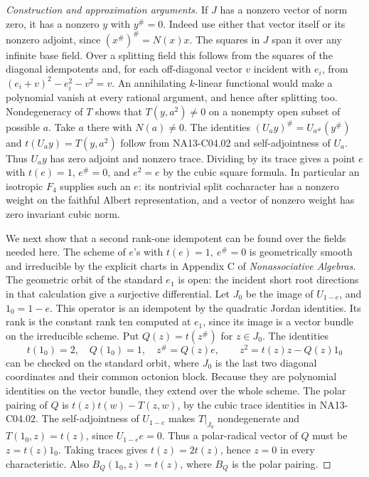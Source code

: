 \documentclass[11pt,a4paper,openany,oneside]{book}
\theoremstyle{resultstyle}
\theoremstyle{definition}
\numberwithin{equation}{chapter}
\begin{document}
\begin{proof}[Construction and approximation arguments]
If \(J\) has a nonzero vector of norm zero,
it has a nonzero \(y\) with \(y^\#=0\).
Indeed use either that vector itself or its
nonzero adjoint, since
\((x^\#)^\#=N(x)x\).
The squares in \(J\) span it over any infinite
base field. Over a splitting field this follows
from the squares of the diagonal idempotents
and, for each off-diagonal vector \(v\) incident
with \(e_i\), from
\((e_i+v)^2-e_i^2-v^2=v\).
An annihilating \(k\)-linear functional would make
a polynomial vanish at every rational argument,
and hence after splitting too. Nondegeneracy of
\(T\) shows that \(T(y,a^2)\ne0\) on a nonempty
open subset of possible \(a\). Take \(a\) there
with \(N(a)\ne0\). The identities
\((U_a y)^\#=U_{a^\#}(y^\#)\) and
\(t(U_a y)=T(y,a^2)\) follow from NA13-C04.02
and self-adjointness of \(U_a\). Thus \(U_a y\)
has zero adjoint and nonzero trace. Dividing
by its trace gives a point \(e\) with \(t(e)=1\),
\(e^\#=0\), and \(e^2=e\) by the cubic square
formula. In particular an isotropic \(F_4\)
supplies such an \(e\): its nontrivial split
cocharacter has a nonzero weight on the
faithful Albert representation, and a vector
of nonzero weight has zero invariant cubic norm.

We next show that a second rank-one idempotent
can be found over the fields needed here.
The scheme of \(e\)'s with \(t(e)=1,\ e^\#=0\)
is geometrically smooth and irreducible by
the explicit charts in Appendix C of
\emph{Nonassociative Algebras}. The geometric orbit
of the standard \(e_1\) is open: the incident
short root directions in that calculation give
a surjective differential. Let \(J_0\) be the
image of \(U_{1-e}\), and \(1_0=1-e\).
This operator is an idempotent by the
quadratic Jordan identities. Its rank is the
constant rank ten computed at \(e_1\), since its
image is a vector bundle on the irreducible
scheme. Put \(Q(z)=t(z^\#)\) for \(z\in J_0\).
The identities
\[
 t(1_0)=2,\quad Q(1_0)=1,\quad
 z^\#=Q(z)e,\qquad z^2=t(z)z-Q(z)1_0
\]
can be checked on the standard orbit, where
\(J_0\) is the last two diagonal coordinates and
their common octonion block. Because they are
polynomial identities on the vector bundle,
they extend over the whole scheme. The polar
pairing of \(Q\) is \(t(z)t(w)-T(z,w)\),
by the cubic trace identities in NA13-C04.02.
The self-adjointness of \(U_{1-e}\) makes
\(T|_{J_0}\) nondegenerate and
\(T(1_0,z)=t(z)\), since \(U_{1-e}e=0\).
Thus a polar-radical vector of \(Q\) must be
\(z=t(z)1_0\). Taking traces gives
\(t(z)=2t(z)\), hence \(z=0\) in every
characteristic. Also
\(B_Q(1_0,z)=t(z)\), where \(B_Q\) is the
polar pairing.


\end{proof}
\end{document}
